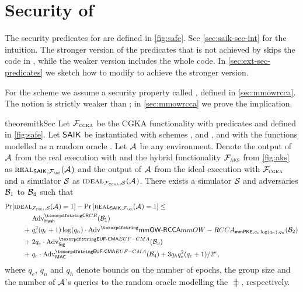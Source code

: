 \section{Security of \saik}\label{sec:bgm_prot_proof}
The security predicates for \saik are defined in \cref{fig:safe}. See \cref{sec:saik-sec-int} for the intuition. The stronger version of the predicates that is not achieved by \saik skips the code in , while the weaker version includes the whole code. In \cref{sec:ext-sec-predicates} we sketch how to modify \saik to achieve the stronger version.



For the \mmPKE scheme we assume a security property called \mmowrcca, defined in \cref{sec:mmowrcca}. The notion is strictly weaker than \mmindcca; in \cref{sec:mmowrcca} we prove the implication.

\begin{restatable}{theorem}{itkSec}\label{thm:itk_secure_conf}
Let $\funcCGKA$ be the CGKA functionality with predicates \KwConf{} and \KwAuth{} defined in \cref{fig:safe}. Let $\saik$ be instantiated with schemes \mmPKE, \sigscheme and \mac, and with the \hkdf functions modelled as a random oracle \hash.
Let $\Adv$ be any environment. Denote the output of $\Adv$ from the real execution with \saik and the hybrid functionality $\funcPKI$ from \cref{fig:aks} as $\ucreal_{\saik, \funcPKI}(\Adv)$ and the output of $\Adv$ from the ideal execution with $\funcCGKA$ and a simulator $\ucsim$ as $\ucideal_{\funcCGKA, \ucsim}(\Adv)$.
%
There exists a simulator $\ucsim$ and adversaries $\Bdv[1]$ to $\Bdv[4]$ such that
\begin{align*}
	\Pr[\ucideal&_{\funcCGKA, \ucsim}(\Adv) = 1] - \Pr\left[\ucreal_{\saik, \funcPKI}(\Adv) = 1\right] \leq \\
	&\textnormal{Adv}^{\gamefont{CR}}_{\hash}(\Bdv[1]) \\
	+\ & q_e^2(q_e+1) \log(q_n) \cdot\textnormal{Adv}^\mmowrcca_{\mmPKE,q_e\log(q_n),q_n}(\Bdv[2]) \\
	+\ & 2q_e\cdot \textnormal{Adv}^{\ufcma}_\sigscheme(\Bdv[3]) \\
	+\ & q_e \cdot \textnormal{Adv}^{\ufcma}_\mac(\Bdv[4]) + 3q_hq_e^2(q_e+1)/2^\kappa,
\end{align*}
where $q_e$, $q_n$ and $q_h$ denote bounds on the number of epochs, the group size and the number of $\Adv$'s queries to the random oracle modelling the $\hash$, respectively.
\end{restatable}

